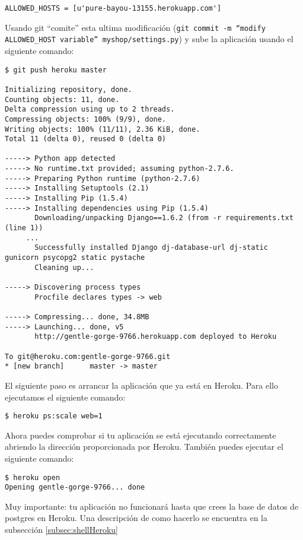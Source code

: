 \documentclass[12pt]{article} %
\begin{document}
\begin{verbatim}
ALLOWED_HOSTS = [u'pure-bayou-13155.herokuapp.com']
\end{verbatim}
Usando git ``comite'' esta ultima modificación (\texttt{git commit -m ``modify ALLOWED\_HOST variable'' myshop/settings.py})  y sube la aplicación usando el siguiente comando:

 
\begin{verbatim}
$ git push heroku master
 
Initializing repository, done. 
Counting objects: 11, done. 
Delta compression using up to 2 threads. 
Compressing objects: 100% (9/9), done. 
Writing objects: 100% (11/11), 2.36 KiB, done. 
Total 11 (delta 0), reused 0 (delta 0) 
 
-----> Python app detected 
-----> No runtime.txt provided; assuming python-2.7.6. 
-----> Preparing Python runtime (python-2.7.6) 
-----> Installing Setuptools (2.1) 
-----> Installing Pip (1.5.4) 
-----> Installing dependencies using Pip (1.5.4) 
       Downloading/unpacking Django==1.6.2 (from -r requirements.txt (line 1)) 
     ...
       Successfully installed Django dj-database-url dj-static gunicorn psycopg2 static pystache 
       Cleaning up... 
 
-----> Discovering process types 
       Procfile declares types -> web 
 
-----> Compressing... done, 34.8MB 
-----> Launching... done, v5 
       http://gentle-gorge-9766.herokuapp.com deployed to Heroku 
 
To git@heroku.com:gentle-gorge-9766.git 
* [new branch]      master -> master 
 \end{verbatim}

El siguiente paso es arrancar la aplicación que ya está en Heroku. Para ello ejecutamos el siguiente comando:

 \begin{verbatim}
$ heroku ps:scale web=1
 \end{verbatim}

Ahora puedes comprobar si tu aplicación se está ejecutando correctamente abriendo la dirección proporcionada por Heroku. También puedes ejecutar el siguiente comando:

 \begin{verbatim}
$ heroku open
Opening gentle-gorge-9766... done
 \end{verbatim}

Muy importante: tu aplicación no funcionará hasta que crees la base de datos de postgres en Heroku. Una descripción de como hacerlo se encuentra en la subsección  \ref{subsec:shellHeroku} 
\end{document}
